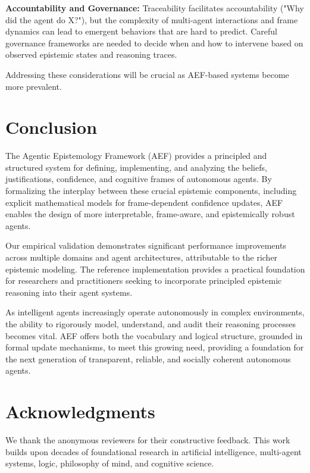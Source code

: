 \documentclass[10pt,a4paper]{article}
\begin{document}
\textbf{Accountability and Governance:} Traceability facilitates accountability ("Why did the agent do X?"), but the complexity of multi-agent interactions and frame dynamics can lead to emergent behaviors that are hard to predict. Careful governance frameworks are needed to decide when and how to intervene based on observed epistemic states and reasoning traces.

Addressing these considerations will be crucial as AEF-based systems become more prevalent.

\section{Conclusion}
The Agentic Epistemology Framework (AEF) provides a principled and structured system for defining, implementing, and analyzing the beliefs, justifications, confidence, and cognitive frames of autonomous agents. By formalizing the interplay between these crucial epistemic components, including explicit mathematical models for frame-dependent confidence updates, AEF enables the design of more interpretable, frame-aware, and epistemically robust agents.

Our empirical validation demonstrates significant performance improvements across multiple domains and agent architectures, attributable to the richer epistemic modeling. The reference implementation provides a practical foundation for researchers and practitioners seeking to incorporate principled epistemic reasoning into their agent systems.

As intelligent agents increasingly operate autonomously in complex environments, the ability to rigorously model, understand, and audit their reasoning processes becomes vital. AEF offers both the vocabulary and logical structure, grounded in formal update mechanisms, to meet this growing need, providing a foundation for the next generation of transparent, reliable, and socially coherent autonomous agents.

\section*{Acknowledgments}
We thank the anonymous reviewers for their constructive feedback. This work builds upon decades of foundational research in artificial intelligence, multi-agent systems, logic, philosophy of mind, and cognitive science.



\end{document}
